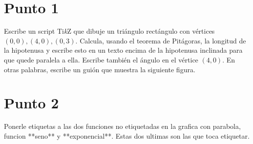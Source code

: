 \documentclass[12pt]{article}
\newcommand{\myTikZ}{Ti\textit{k}Z }
\begin{document}
\section{Punto 1}

Escribe un script \myTikZ que dibuje un triángulo rectángulo con vértices $(0,0), (4,0), (0,3)$.
Calcula, usando el teorema de Pitágoras, la longitud de la hipotenusa y escribe esto
en un texto encima de la hipotenusa inclinada para que quede paralela a ella.
Escribe también el ángulo en el vértice $(4,0)$. En otras palabras, escribe un guión que
muestra la siguiente figura.



\section{Punto 2}

Ponerle etiquetas a las dos funciones no etiquetadas en
la grafica con parabola, funcion **seno** y **exponencial**. Estas dos ultimas son las que toca etiquetar.
\end{document}
